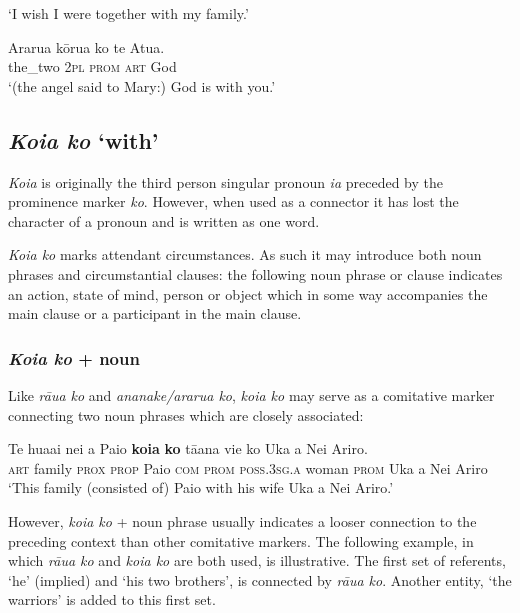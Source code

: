 \glt 
‘I wish I were together with my family.’ \textstyleExampleref{[R210.134]} 
\z

\ea\label{ex:8.200}
\gll Ararua kōrua ko te {\ꞌ}Atua. \\
the\_two \textsc{2pl} \textsc{prom} \textsc{art} God \\

\glt 
‘(the angel said to Mary:) God is with you.’ \textstyleExampleref{[R339.005]} 
\z
{}
\subsection{\textit{Koia ko} ‘with’}\label{sec:8.10.4}
\textit{Koia} is originally the third person singular pronoun \textit{ia} preceded by the prominence marker \textit{ko}. However, when used as a connector it has lost the character of a pronoun and is written as one word.

\textit{Koia ko} marks attendant circumstances. As such it may introduce both noun phrases and circumstantial clauses: the following noun phrase or clause indicates an action, state of mind, person or object which in some way accompanies the main clause or a participant in the main clause. 

\subsubsection{\textit{Koia ko} + noun}\label{sec:8.10.4.1}
Like \textit{rāua ko} and \textit{ananake/ararua ko}, \textit{koia ko} may serve as a comitative marker connecting two noun phrases which are closely associated:

\ea\label{ex:8.201}
\gll Te hua{\ꞌ}ai nei a Paio \textbf{koia} \textbf{ko} tā{\ꞌ}ana vi{\ꞌ}e ko Uka {\ꞌ}a Nei Ariro. \\
\textsc{art} family \textsc{prox} \textsc{prop} Paio \textsc{com} \textsc{prom} \textsc{poss.3sg.a} woman \textsc{prom} Uka a Nei Ariro \\

\glt
‘This family (consisted of) Paio with his wife Uka a Nei Ariro.’ \textstyleExampleref{[R439.003]} 
\z

However, \textit{koia ko} + noun phrase usually indicates a looser connection to the preceding context than other comitative markers. The following example, in which \textit{rāua ko} and \textit{koia ko} are both used, is illustrative. The first set of referents, ‘he’ (implied) and ‘his two brothers’, is connected by \textit{rāua ko}. Another entity, ‘the warriors’ is added to this first set.

